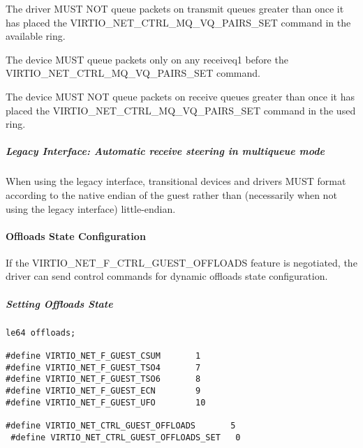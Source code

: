 The driver MUST NOT queue packets on transmit queues greater than
 once it has placed the VIRTIO_NET_CTRL_MQ_VQ_PAIRS_SET command in the available ring.


The device MUST queue packets only on any receiveq1 before the 
VIRTIO_NET_CTRL_MQ_VQ_PAIRS_SET command.

The device MUST NOT queue packets on receive queues greater than
 once it has placed the VIRTIO_NET_CTRL_MQ_VQ_PAIRS_SET command in the used ring.

\subparagraph{Legacy Interface: Automatic receive steering in multiqueue mode}\label{sec:Device Types / Network Device / Device Operation / Control Virtqueue / Automatic receive steering in multiqueue mode / Legacy Interface: Automatic receive steering in multiqueue mode}
When using the legacy interface, transitional devices and drivers
MUST format 
according to the native endian of the guest rather than
(necessarily when not using the legacy interface) little-endian.

\paragraph{Offloads State Configuration}\label{sec:Device Types / Network Device / Device Operation / Control Virtqueue / Offloads State Configuration}

If the VIRTIO_NET_F_CTRL_GUEST_OFFLOADS feature is negotiated, the driver can
send control commands for dynamic offloads state configuration.

\subparagraph{Setting Offloads State}\label{sec:Device Types / Network Device / Device Operation / Control Virtqueue / Offloads State Configuration / Setting Offloads State}

\begin{lstlisting}
le64 offloads;

#define VIRTIO_NET_F_GUEST_CSUM       1
#define VIRTIO_NET_F_GUEST_TSO4       7
#define VIRTIO_NET_F_GUEST_TSO6       8
#define VIRTIO_NET_F_GUEST_ECN        9
#define VIRTIO_NET_F_GUEST_UFO        10

#define VIRTIO_NET_CTRL_GUEST_OFFLOADS       5
 #define VIRTIO_NET_CTRL_GUEST_OFFLOADS_SET   0
\end{lstlisting}

